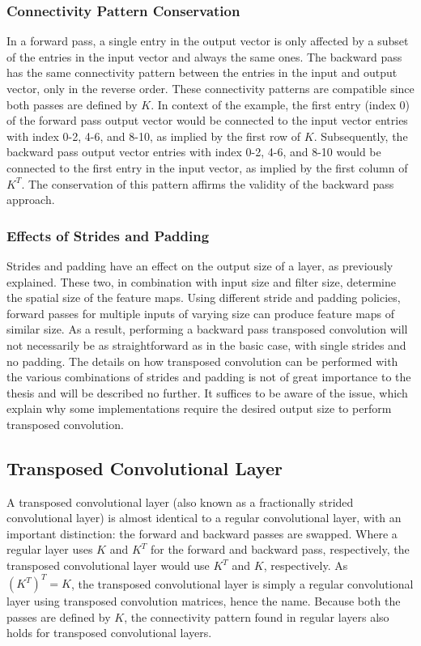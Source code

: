 \subsubsection{Connectivity Pattern Conservation}

In a forward pass, a single entry in the output vector is only affected by a subset of the entries in the input vector and always the same ones. The backward pass has the same connectivity pattern between the entries in the input and output vector, only in the reverse order. These connectivity patterns are compatible since both passes are defined by $K$. In context of the example, the first entry (index 0) of the forward pass output vector would be connected to the input vector entries with index 0-2, 4-6, and 8-10, as implied by the first row of $K$. Subsequently, the backward pass output vector entries with index 0-2, 4-6, and 8-10 would be connected to the first entry in the input vector, as implied by the first column of $K^T$. The conservation of this pattern affirms the validity of the backward pass approach.

\subsubsection{Effects of Strides and Padding}

Strides and padding have an effect on the output size of a layer, as previously explained. These two, in combination with input size and filter size, determine the spatial size of the feature maps. Using different stride and padding policies, forward passes for multiple inputs of varying size can produce feature maps of similar size. As a result, performing a backward pass transposed convolution will not necessarily be as straightforward as in the basic case, with single strides and no padding. The details on how transposed convolution can be performed with the various combinations of strides and padding is not of great importance to the thesis and will be described no further. It suffices to be aware of the issue, which explain why some implementations require the desired output size to perform transposed convolution.

\subsection{Transposed Convolutional Layer} \label{trans-conv}

A transposed convolutional layer (also known as a fractionally strided convolutional layer) is almost identical to a regular convolutional layer, with an important distinction: the forward and backward passes are swapped. Where a regular layer uses $K$ and $K^T$ for the forward and backward pass, respectively, the transposed convolutional layer would use $K^T$ and $K$, respectively. As $(K^T)^T=K$, the transposed convolutional layer is simply a regular convolutional layer using transposed convolution matrices, hence the name. Because both the passes are defined by $K$, the connectivity pattern found in regular layers also holds for transposed convolutional layers. \\

